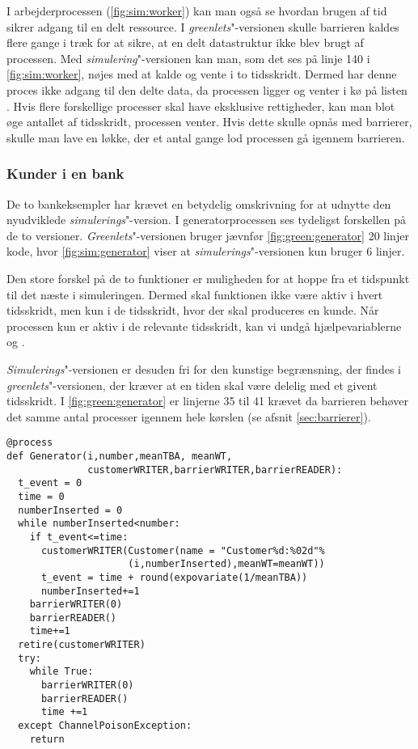 I arbejderprocessen (\cref{fig:sim:worker}) kan man også se hvordan brugen af tid  sikrer adgang til en delt ressource. I  \emph{greenlets}"-versionen skulle barrieren  kaldes flere gange i træk for at sikre, at en delt datastruktur ikke blev brugt af processen. Med \emph{simulering}"-versionen kan man, som det ses på linje 140 i \cref{fig:sim:worker}, nøjes med at kalde  og vente i to tidsskridt. Dermed har denne proces ikke adgang til den delte data, da processen  ligger og venter i kø på  listen . Hvis flere forskellige processer skal have eksklusive rettigheder, kan man blot øge antallet af tidsskridt, processen venter. Hvis dette skulle opnås med barrierer, skulle man lave en løkke, der et antal gange lod processen gå igennem barrieren.

\subsubsection{Kunder i en bank}
De to bankeksempler har krævet en betydelig omskrivning for at udnytte den nyudviklede \emph{simulerings}"-version. I generatorprocessen ses tydeligst forskellen på de to versioner. \emph{Greenlets}"-versionen bruger jævnfør \cref{fig:green:generator} 20 linjer kode, hvor \cref{fig:sim:generator} viser at \emph{simulerings}"-versionen kun bruger 6 linjer. 

Den store forskel på de to funktioner er muligheden for at hoppe fra et tidspunkt til det næste i simuleringen. Dermed skal funktionen ikke være aktiv i hvert tidsskridt, men kun i de tidsskridt, hvor der skal produceres en kunde. Når processen kun er aktiv i de relevante tidsskridt, kan vi undgå hjælpevariablerne  og . 

\emph{Simulerings}"-versionen er desuden fri for den kunstige begrænsning, der findes i \emph{greenlets}"-versionen, der kræver at en tiden skal være delelig med et givent tidsskridt. I \cref{fig:green:generator} er linjerne 35 til 41 krævet da barrieren behøver det samme antal processer igennem hele kørslen (se afsnit \cref{sec:barrierer}). 

\begin{lstlisting}[firstnumber=21, label=fig:green:generator, caption=Generatorprocessen for \emph{greenlets}-versionen]
@process
def Generator(i,number,meanTBA, meanWT,
              customerWRITER,barrierWRITER,barrierREADER):
  t_event = 0
  time = 0
  numberInserted = 0
  while numberInserted<number:
    if t_event<=time:
      customerWRITER(Customer(name = "Customer%d:%02d"%
                     (i,numberInserted),meanWT=meanWT))
      t_event = time + round(expovariate(1/meanTBA))
      numberInserted+=1
    barrierWRITER(0)
    barrierREADER()
    time+=1
  retire(customerWRITER)
  try:
    while True:
      barrierWRITER(0)
      barrierREADER()
      time +=1
  except ChannelPoisonException: 
    return
\end{lstlisting}

